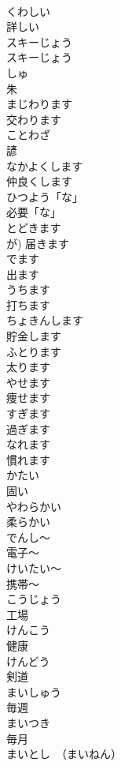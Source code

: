 \documentclass[8pt]{extreport}
\begin{document}
\begin{CJK}{UTF8}{min}
\\	くわしい	
\\	詳しい	
\\	スキーじょう	
\\	スキーじょう		
\\	しゅ	
\\	朱		
\\	まじわります	
\\	交わります		
\\	ことわざ	
\\	諺		
\\	なかよくします	
\\	仲良くします		
\\	ひつよう「な」	
\\	必要「な」		
\\	とどきます	
\\	が)	届きます	
\\	でます	
\\	出ます 
\\	うちます	
\\	打ちます	
\\	ちょきんします	
\\	貯金します	
\\	ふとります	
\\	太ります	
\\	やせます	
\\	痩せます		
\\	すぎます	
\\	過ぎます	
\\	なれます	
\\	慣れます	
\\	かたい	
\\	固い	
\\	やわらかい	
\\	柔らかい	
\\	でんし〜	
\\	電子〜	
\\	けいたい〜	
\\	携帯〜	
\\	こうじょう	
\\	工場		
\\	けんこう	
\\	健康	
\\	けんどう	
\\	剣道		
\\	まいしゅう	
\\	毎週	
\\	まいつき	
\\	毎月	
\\	まいとし　（まいねん）	

\end{CJK}
\end{document}
